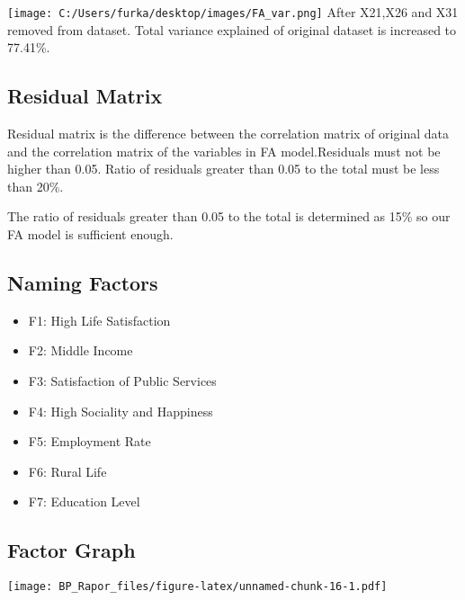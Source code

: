 \documentclass[12pt,twoside]{deuthesis}
\newenvironment{Shaded}{\begin{snugshade}}{\end{snugshade}}
\newcommand{\AttributeTok}[1]{\textcolor[rgb]{0.77,0.63,0.00}{#1}}
\newcommand{\DecValTok}[1]{\textcolor[rgb]{0.00,0.00,0.81}{#1}}
\newcommand{\FloatTok}[1]{\textcolor[rgb]{0.00,0.00,0.81}{#1}}
\newcommand{\FunctionTok}[1]{\textcolor[rgb]{0.00,0.00,0.00}{#1}}
\newcommand{\NormalTok}[1]{#1}
\newcommand{\SpecialCharTok}[1]{\textcolor[rgb]{0.00,0.00,0.00}{#1}}
\newcommand{\StringTok}[1]{\textcolor[rgb]{0.31,0.60,0.02}{#1}}
\providecommand{\tightlist}{%
  \setlength{\itemsep}{0pt}\setlength{\parskip}{0pt}}
\begin{document}
\texttt{[image: C:/Users/furka/desktop/images/FA\_var.png]}
After X21,X26 and X31 removed from dataset. Total variance explained of original dataset is increased to 77.41\%.

\hypertarget{residual-matrix}{%
\subsection{Residual Matrix}\label{residual-matrix}}

Residual matrix is the difference between the correlation matrix of original data and the correlation matrix of the variables in FA model.Residuals must not be higher than 0.05.
Ratio of residuals greater than 0.05 to the total must be less than 20\%.\\

\setlength{\parskip}{0in}

The ratio of residuals greater than 0.05 to the total is determined as 15\% so our FA model is sufficient enough.

\hypertarget{naming-factors}{%
\subsection{Naming Factors}\label{naming-factors}}
\begin{itemize}
\tightlist
\item
  F1: High Life Satisfaction
\item
  F2: Middle Income
\item
  F3: Satisfaction of Public Services
\item
  F4: High Sociality and Happiness
\item
  F5: Employment Rate
\item
  F6: Rural Life
\item
  F7: Education Level
\end{itemize}
\hypertarget{factor-graph}{%
\subsection{Factor Graph}\label{factor-graph}}
\begin{Shaded}
\end{Shaded}
\texttt{[image: BP\_Rapor\_files/figure-latex/unnamed-chunk-16-1.pdf]}
\end{document}
